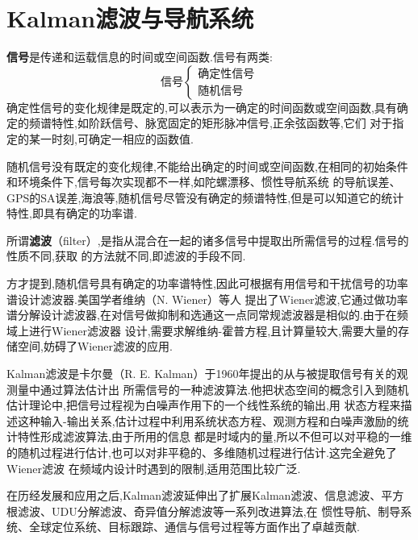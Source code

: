 \documentclass[cn,10pt,citestyle=gb7714-2015,bibstyle=gb7714-2015]{elegantbook}
\renewcommand{\emph}[1]{\textbf{#1}}%
\begin{document}
\section{Kalman滤波与导航系统}
\emph{信号}是传递和运载信息的时间或空间函数.信号有两类:
\[
  \text{信号}\begin{cases}
    \text{确定性信号}\\
    \text{随机信号}
  \end{cases}
\]
确定性信号的变化规律是既定的,可以表示为一确定的时间函数或空间函数,具有确定的频谱特性,如阶跃信号、脉宽固定的矩形脉冲信号,正余弦函数等,它们
对于指定的某一时刻,可确定一相应的函数值.

随机信号没有既定的变化规律,不能给出确定的时间或空间函数,在相同的初始条件和环境条件下,信号每次实现都不一样,如陀螺漂移、惯性导航系统
的导航误差、GPS的SA误差,海浪等,随机信号尽管没有确定的频谱特性,但是可以知道它的统计特性,即具有确定的功率谱.

所谓\emph{滤波}（filter）,是指从混合在一起的诸多信号中提取出所需信号的过程.信号的性质不同,获取
的方法就不同,即滤波的手段不同.

方才提到,随机信号具有确定的功率谱特性,因此可根据有用信号和干扰信号的功率谱设计滤波器.美国学者维纳（N. Wiener）等人
提出了Wiener滤波,它通过做功率谱分解设计滤波器,在对信号做抑制和选通这一点同常规滤波器是相似的.由于在频域上进行Wiener滤波器
设计,需要求解维纳-霍普方程,且计算量较大,需要大量的存储空间,妨碍了Wiener滤波的应用.

Kalman滤波是卡尔曼（R. E. Kalman）于1960年提出的从与被提取信号有关的观测量中通过算法估计出
所需信号的一种滤波算法.他把状态空间的概念引入到随机估计理论中,把信号过程视为白噪声作用下的一个线性系统的输出,用
状态方程来描述这种输入-输出关系,估计过程中利用系统状态方程、观测方程和白噪声激励的统计特性形成滤波算法,由于所用的信息
都是时域内的量,所以不但可以对平稳的一维的随机过程进行估计,也可以对非平稳的、多维随机过程进行估计.这完全避免了Wiener滤波
在频域内设计时遇到的限制,适用范围比较广泛.

在历经发展和应用之后,Kalman滤波延伸出了扩展Kalman滤波、信息滤波、平方根滤波、UDU分解滤波、奇异值分解滤波等一系列改进算法,在
惯性导航、制导系统、全球定位系统、目标跟踪、通信与信号过程等方面作出了卓越贡献.
\newpage
\nocite{*}
\printbibliography
\end{document}

